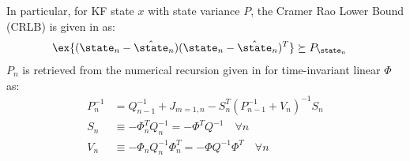 In particular, for KF state $x$ with state variance $P$, the Cramer Rao Lower Bound (CRLB) is given in \cite{karlsson2005} as:
\begin{align}
& \ex{(\state_n - \hat{\state}_{n})(\state_n - \hat{\state}_{n})^T} \succeq P_{\state_n} 
\end{align}
$P_{n}$ is retrieved from the numerical recursion given in \cite{karlsson2005} for time-invariant linear $\Phi$ as:
\begin{align}
P_{n}^{-1} &= Q_{n-1}^{-1} + J_{m=1, n} - S_n^T(P_{n-1}^{-1} + V_n)^{-1}S_n \\
S_n &\equiv -\Phi_n^T Q_n^{-1} = -\Phi^T Q^{-1} \quad \forall n \\
V_n &\equiv -\Phi_n Q_n^{-1}\Phi_n^T  = -\Phi Q^{-1}\Phi^T \quad \forall n 
\end{align}
